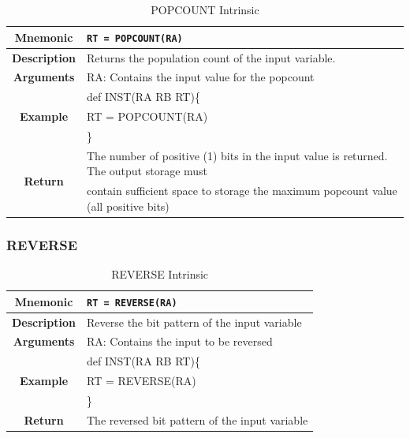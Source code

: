 \documentclass{article}
\begin{document}
\begin{table}[h]
\begin{center}
\caption{POPCOUNT Intrinsic}
\vspace{0.125in}
\label{tab:POPCOUNTIntrinsic}
\begin{tabular}{|c|l|}
\hline
\textbf{Mnemonic} & \texttt{RT = POPCOUNT(RA)}\\
\hline
\textbf{Description} & Returns the population count of the input variable.\\
\hline
\textbf{Arguments} & RA: Contains the input value for the popcount\\
                          			     
\hline
\multirow{3}{*}{\textbf{Example}} & def INST(RA RB RT)\{\\
                          			  &   RT = POPCOUNT(RA)\\
                                                    & \}\\
\hline
\multirow{2}{*}{\textbf{Return}} & The number of positive (1) bits in the input value is returned.  The output storage must \\
			& contain sufficient space to storage the maximum popcount value (all positive bits)\\                                                    
\hline
\end{tabular}
\end{center}
\end{table}

\clearpage
\subsubsection{REVERSE}
\label{sec:REVERSE}

\begin{table}[h]
\begin{center}
\caption{REVERSE Intrinsic}
\vspace{0.125in}
\label{tab:REVERSEIntrinsic}
\begin{tabular}{|c|l|}
\hline
\textbf{Mnemonic} & \texttt{RT = REVERSE(RA)}\\
\hline
\textbf{Description} & Reverse the bit pattern of the input variable\\
\hline
\textbf{Arguments} & RA: Contains the input to be reversed\\
\hline
\multirow{3}{*}{\textbf{Example}} & def INST(RA RB RT)\{\\
                          			  &   RT = REVERSE(RA)\\
                                                    & \}\\
\hline
\textbf{Return} & The reversed bit pattern of the input variable\\                                                    
\hline
\end{tabular}
\end{center}
\end{table}
\end{document}
